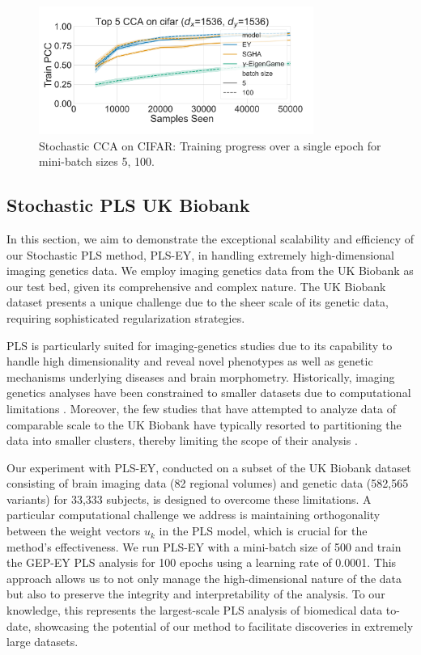 \begin{figure}
    \centering
    \includegraphics[width=0.8\textwidth]{figures/CCA/cifar_allbatchsizes_pcc}
    \caption{Stochastic CCA on CIFAR: Training progress over a single epoch for mini-batch sizes 5, 100.}
    \label{fig:learningcurve_cifar}
\end{figure}

\subsection{Stochastic PLS UK Biobank}
In this section, we aim to demonstrate the exceptional scalability and efficiency of our Stochastic PLS method, PLS-EY, in handling extremely high-dimensional imaging genetics data.
We employ imaging genetics data from the UK Biobank \citep{sudlow2015uk} as our test bed, given its comprehensive and complex nature.
The UK Biobank dataset presents a unique challenge due to the sheer scale of its genetic data, requiring sophisticated regularization strategies.

PLS is particularly suited for imaging-genetics studies due to its capability to handle high dimensionality and reveal novel phenotypes as well as genetic mechanisms underlying diseases and brain morphometry.
Historically, imaging genetics analyses have been constrained to smaller datasets due to computational limitations \citep{Lorenzi2018,Taquet2021,Lefloch2012}.
Moreover, the few studies that have attempted to analyze data of comparable scale to the UK Biobank have typically resorted to partitioning the data into smaller clusters, thereby limiting the scope of their analysis \citep{lorenzi2017secure, altmann2023tackling}.

Our experiment with PLS-EY, conducted on a subset of the UK Biobank dataset consisting of brain imaging data (82 regional volumes) and genetic data (582,565 variants) for 33,333 subjects, is designed to overcome these limitations.
A particular computational challenge we address is maintaining orthogonality between the weight vectors \( u_k \) in the PLS model, which is crucial for the method's effectiveness.
We run PLS-EY with a mini-batch size of 500 and train the GEP-EY PLS analysis for 100 epochs using a learning rate of 0.0001.
This approach allows us to not only manage the high-dimensional nature of the data but also to preserve the integrity and interpretability of the analysis.
To our knowledge, this represents the largest-scale PLS analysis of biomedical data to-date, showcasing the potential of our method to facilitate discoveries in extremely large datasets.

